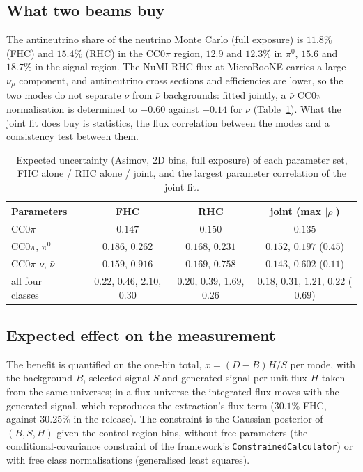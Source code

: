 \documentclass[11pt,a4paper]{article}
\begin{document}
\subsection{What two beams buy}

The antineutrino share of the neutrino Monte Carlo (full exposure) is $11.8\%$ (FHC) and $15.4\%$ (RHC) in the
CC$0\pi$ region, $12.9$ and $12.3\%$ in $\pi^0$, $15.6$ and $18.7\%$ in the signal region. The NuMI RHC flux at
MicroBooNE carries a large $\nu_\mu$ component, and antineutrino cross sections and efficiencies are lower, so the
two modes do not separate $\nu$ from $\bar\nu$ backgrounds: fitted jointly, a $\bar\nu$ CC$0\pi$ normalisation is
determined to $\pm0.60$ against $\pm0.14$ for $\nu$ (Table~\ref{tab:fisher}). What the joint fit does buy is
statistics, the flux correlation between the modes and a consistency test between them.

\begin{table}[H]
  \centering
  \caption{Expected uncertainty (Asimov, 2D bins, full exposure) of each parameter set, FHC alone / RHC alone /
    joint, and the largest parameter correlation of the joint fit.}
  \label{tab:fisher}
  \small
  \begin{tabular}{llccc}
    \toprule
    Parameters & & FHC & RHC & joint (max $|\rho|$) \\
    \midrule
    CC$0\pi$ & & $0.147$ & $0.150$ & $0.135$ \\
    CC$0\pi$, $\pi^0$ & & $0.186$, $0.262$ & $0.168$, $0.231$ & $0.152$, $0.197$ ($0.45$) \\
    CC$0\pi$ $\nu$, $\bar\nu$ & & $0.159$, $0.916$ & $0.169$, $0.758$ & $0.143$, $0.602$ ($0.11$) \\
    all four classes & & $0.22$, $0.46$, $2.10$, $0.30$ & $0.20$, $0.39$, $1.69$, $0.26$ & $0.18$, $0.31$, $1.21$, $0.22$ ($0.69$) \\
    \bottomrule
  \end{tabular}
\end{table}

\subsection{Expected effect on the measurement}

The benefit is quantified on the one-bin total, $x=(D-B)H/S$ per mode, with the background $B$, selected signal
$S$ and generated signal per unit flux $H$ taken from the same universes; in a flux universe the integrated flux
moves with the generated signal, which reproduces the extraction's flux term ($30.1\%$ FHC, against $30.25\%$ in
the release). The constraint is the Gaussian posterior of $(B,S,H)$ given the control-region bins, without free
parameters (the conditional-covariance constraint of the framework's \texttt{ConstrainedCalculator}) or with free
class normalisations (generalised least squares).
\end{document}
